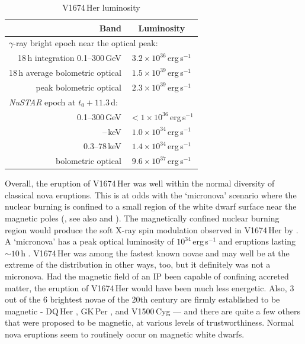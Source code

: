 \documentclass[a4paper,fleqn,usenatbib]{mnras}
\newcommand{\nova}{V1674\,Her}
\newcommand{\opticalpeaklum}{$2.3 \times 10^{39}$\,erg\,s$^{-1}$}
\newcommand{\opticalnustareplum}{$9.6 \times 10^{37}$\,erg\,s$^{-1}$}
\newcommand{\latpeaklum}{$3.2 \times 10^{36}$\,erg\,s$^{-1}$}
\newcommand{\latnustareplum}{$< 1 \times 10^{36}$\,erg\,s$^{-1}$}
\newcommand{\nustarlum}{$1.0 \times 10^{34}$\,erg\,s$^{-1}$}
\newcommand{\nustarlumextrapolated}{$1.4 \times 10^{34}$\,erg\,s$^{-1}$}
\newcommand{\tnustarep}{$t_0+11.3$\,d}
\begin{document}
\begin{table}
\begin{center}
\caption{\nova{} luminosity}
\label{tab:luminositiestable}
\begin{tabular}{rc}
\hline\hline
Band       & Luminosity \\
\hline
\multicolumn{2}{l}{$\gamma$-ray bright epoch near the optical peak:} \\
18\,h integration 0.1--300\,GeV & \latpeaklum{} \\
18\,h average bolometric optical & $1.5 \times 10^{39}$\,erg\,s$^{-1}$ \\
        peak bolometric optical & \opticalpeaklum{} \\
\hline
\multicolumn{2}{l}{{\em NuSTAR} epoch at \tnustarep{}:} \\
                  0.1--300\,GeV & \latnustareplum{} \\
 \nustarenergylow{}--\nustarenergyhigh{}\,keV  & \nustarlum{} \\
                  0.3--78\,keV  & \nustarlumextrapolated{} \\
             bolometric optical & \opticalnustareplum{} \\
\hline
\hline
\end{tabular}
\begin{flushleft}
\end{flushleft}
\end{center}
\end{table}


Overall, the eruption of \nova{} was well within the normal diversity of classical nova eruptions. 
This is at odds with the `micronova' scenario where the nuclear burning is confined to a small region of the white dwarf surface
near the magnetic poles (\citealt{2022Natur.604..447S,2022MNRAS.514L..11S}, see also \citealt{1988ApJ...330..264L} and \citealt{1989PASP..101....5S}). 
The magnetically confined nuclear burning region would produce the soft X-ray spin modulation observed 
in \nova{} by \cite{2021ApJ...922L..42D,2022MNRAS.517L..97L}.
A `micronova' has a peak optical luminosity of $10^{34}$\,erg\,s$^{-1}$ and eruptions lasting $\sim 10$\,h \citep{2022Natur.604..447S}.
\nova{} was among the fastest known novae and may well be at the extreme of the distribution in other ways, too, 
but it definitely was not a micronova. 
Had the magnetic field of an IP been capable of confining accreted matter, 
the eruption of \nova{} would have been much less energetic. 
Also, 3 out of the 6 brightest novae of the 20th century are firmly established to be magnetic 
- DQ\,Her \citep{1956ApJ...123...68W}, GK\,Per \citep{1988MNRAS.231..783N}, and V1500\,Cyg
\citep{1988ApJ...332..282S} --- and there are quite a few others that were proposed to be 
magnetic, at various levels of trustworthiness. Normal nova eruptions seem to routinely occur on magnetic white dwarfs.
\end{document}
